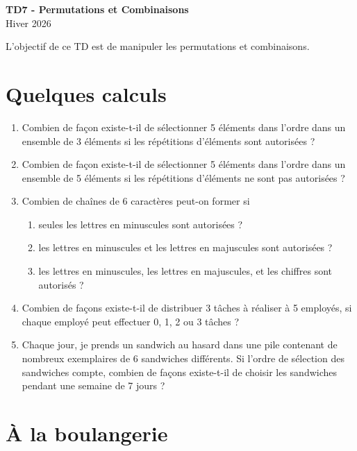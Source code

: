 \documentclass[a4paper,11pt]{article}
\begin{document}
\begin{center}
{\Huge\bfseries TD7 - Permutations et Combinaisons} \\[0.5cm]
{\large Hiver 2026} \\[0.3cm]
\end{center}

\vspace{0.5cm}

L'objectif de ce TD est de manipuler les permutations et combinaisons.

\section{Quelques calculs}

\begin{enumerate}
\item Combien de façon existe-t-il de sélectionner 5 éléments dans l'ordre dans un ensemble de 3 éléments si les répétitions d'éléments sont autorisées ?

\item Combien de façon existe-t-il de sélectionner 5 éléments dans l'ordre dans un ensemble de 5 éléments si les répétitions d'éléments ne sont pas autorisées ?

\item Combien de chaînes de 6 caractères peut-on former si
\begin{enumerate}
\item seules les lettres en minuscules sont autorisées ?
\item les lettres en minuscules et les lettres en majuscules sont autorisées ?
\item les lettres en minuscules, les lettres en majuscules, et les chiffres sont autorisés ?
\end{enumerate}

\item Combien de façons existe-t-il de distribuer 3 tâches à réaliser à 5 employés, si chaque employé peut effectuer 0, 1, 2 ou 3 tâches ?

\item Chaque jour, je prends un sandwich au hasard dans une pile contenant de nombreux exemplaires de 6 sandwiches différents. Si l'ordre de sélection des sandwiches compte, combien de façons existe-t-il de choisir les sandwiches pendant une semaine de 7 jours ?
\end{enumerate}

\section{À la boulangerie}
\end{document}
